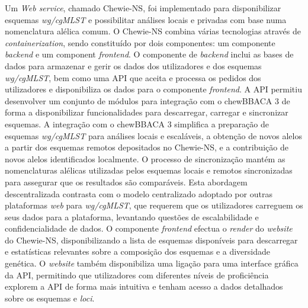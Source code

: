 Um \textit{Web service}, chamado Chewie-NS, foi implementado para disponibilizar esquemas \textit{wg/cgMLST} e possibilitar análises locais e privadas com base numa nomenclatura alélica comum. O Chewie-NS combina várias tecnologias através de \textit{containerization}, sendo constituído por dois componentes: um componente \textit{backend} e um component \textit{frontend}. O componente de \textit{backend} inclui as bases de dados para armazenar e gerir os dados dos utilizadores e dos esquemas \textit{wg/cgMLST}, bem como uma API que aceita e processa os pedidos dos utilizadores e disponibiliza os dados para o componente \textit{frontend}. A API permitiu desenvolver um conjunto de módulos para integração com o chewBBACA 3 de forma a disponibilizar funcionalidades para descarregar, carregar e sincronizar esquemas. A integração com o chewBBACA 3 simplifica a preparação de esquemas \textit{wg/cgMLST} para análises locais e escaláveis, a obtenção de novos alelos a partir dos esquemas remotos depositados no Chewie-NS, e a contribuição de novos alelos identificados localmente. O processo de sincronização mantém as nomenclaturas alélicas utilizadas pelos esquemas locais e remotos sincronizadas para assegurar que os resultados são comparáveis. Esta abordagem descentralizada contrasta com o modelo centralizado adoptado por outras plataformas \textit{web} para \textit{wg/cgMLST}, que requerem que os utilizadores carreguem os seus dados para a plataforma, levantando questões de escalabilidade e confidencialidade de dados. O componente \textit{frontend} efectua o \textit{render} do \textit{website} do Chewie-NS, disponibilizando a lista de esquemas disponíveis para descarregar e estatísticas relevantes sobre a composição dos esquemas e a diversidade genética. O \textit{website} também disponibiliza uma ligação para uma interface gráfica da API, permitindo que utilizadores com diferentes níveis de proficiência explorem a API de forma mais intuitiva e tenham acesso a dados detalhados sobre os esquemas e \textit{loci}.

